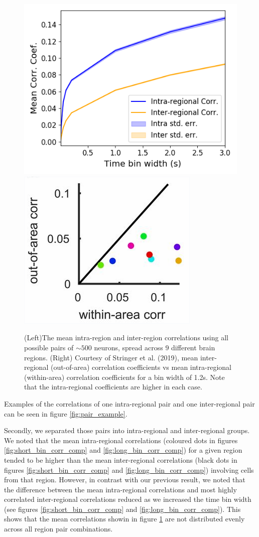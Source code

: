   \begin{figure}[h]
    \includegraphics[width=0.5\linewidth]{figures/eight_probe/Krebs_inter_intra_regional_correlations.png}
    \includegraphics[width=0.5\linewidth]{figures/eight_probe/stringer_2019.png}
    \caption{(Left)The mean intra-region and inter-region correlations using all possible pairs of $\sim 500$ neurons, spread across $9$ different brain regions. (Right) Courtesy of Stringer et al. (2019), mean inter-regional (out-of-area) correlation coefficients vs  mean intra-regional (within-area) correlation coefficients for a bin width of 1.2s. Note that the intra-regional coefficients are higher in each case.}
    \label{fig:all_pairs_inter_intra_corr}
  \end{figure}

  Examples of the correlations of one intra-regional pair and one inter-regional pair can be seen in figure \ref{fig:pair_example}.

  Secondly, we separated those pairs into intra-regional and inter-regional groups. We noted that the mean intra-regional correlations (coloured dots in figures \ref{fig:short_bin_corr_comp} and \ref{fig:long_bin_corr_comp}) for a given region tended to be higher than the mean inter-regional correlations (black dots in figures \ref{fig:short_bin_corr_comp} and \ref{fig:long_bin_corr_comp}) involving cells from that region. However, in contrast with our previous result, we noted that the difference between the mean intra-regional correlations and most highly correlated inter-regional correlations reduced as we increased the time bin width (see figures \ref{fig:short_bin_corr_comp} and \ref{fig:long_bin_corr_comp}). This shows that the mean correlations showin in figure \ref{fig:all_pairs_inter_intra_corr} are not distributed evenly across all region pair combinations.

